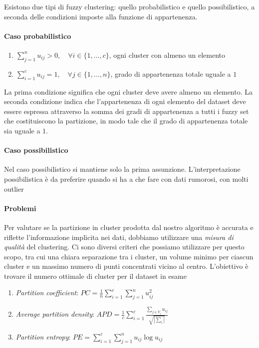 Esistono due tipi di fuzzy clustering: quello probabilistico e quello possibilistico, a seconda delle condizioni imposte alla funzione di appartenenza.
\paragraph{Caso probabilistico}
\begin{enumerate}
    \item{$\sum_{j=1}^{n} u_{ij} > 0, \quad \forall i \in \{1,\dots,c \} $}, ogni cluster con almeno un elemento
    \item{$\sum_{i=1}^{c} u_{ij} = 1, \quad \forall j \in \{1,\dots,n \} $}, grado di appartenenza totale uguale a $1$
\end{enumerate}
La prima condizione significa che ogni cluster deve avere almeno un elemento. La seconda condizione indica che l'appartenenza di ogni elemento del dataset deve essere espressa attraverso la somma dei gradi di appartenenza a tutti i fuzzy set che costituiscono la partizione, in modo tale che il grado di appartenenza totale sia uguale a $1$.
\paragraph{Caso possibilistico}
Nel caso possibilistico si mantiene solo la prima assunzione. L’interpretazione possibilistica è da preferire quando si ha a che fare con dati rumorosi, con molti outlier

\paragraph{Problemi}
Per valutare se la partizione in cluster prodotta dal nostro algoritmo è accurata e riflette l'informazione implicita nei dati, dobbiamo utilizzare una \textit{misura di qualità} del clustering. Ci sono diversi criteri che possiamo utilizzare per questo scopo, tra cui una chiara separazione tra i cluster, un volume minimo per ciascun cluster e un massimo numero di punti concentrati vicino al centro. L'obiettivo è trovare il numero ottimale di cluster per il dataset in esame
\begin{enumerate}
    \item{\textit{Partition coefficient}: $PC = \frac{1}{n}\sum_{i=1}^{c} \sum_{j=1}^{n} u_{ij}^2$}
    \item{\textit{Average partition density}: $APD = \frac{1}{c} \sum_{i=1}^c \frac{\sum_{j \in Y_i} u_{ij}}{\sqrt{|\sum_i|}}$}
    \item{\textit{Partition entropy}: $PE = \sum_{i=1}^{c} \sum_{j=1}^{n} u_{ij} \log u_{ij}$}
\end{enumerate}


